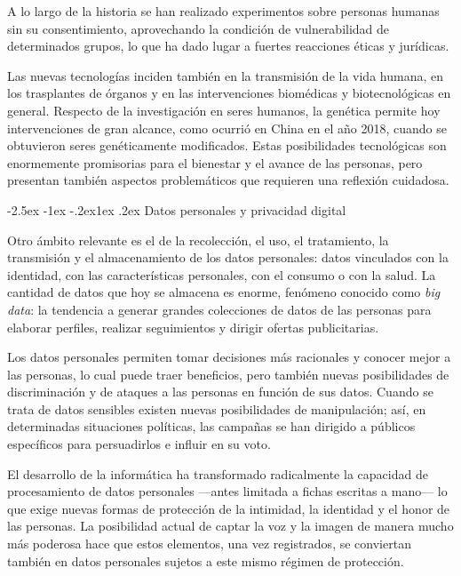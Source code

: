 \documentclass[12pt,oneside]{book}
\makeatletter
\renewcommand\subsection{\@startsection{subsection}{2}{\z@}%
  {-2.5ex \@plus -1ex \@minus -.2ex}{1ex \@plus .2ex}%
  {\normalfont\normalsize\bfseries}}
\makeatother
\begin{document}
\begin{nota}
A lo largo de la historia se han realizado experimentos sobre personas humanas sin su consentimiento, aprovechando la condición de vulnerabilidad de determinados grupos, lo que ha dado lugar a fuertes reacciones éticas y jurídicas.
\end{nota}

Las nuevas tecnologías inciden también en la transmisión de la vida humana, en los trasplantes de órganos y en las intervenciones biomédicas y biotecnológicas en general. Respecto de la investigación en seres humanos, la genética permite hoy intervenciones de gran alcance, como ocurrió en China en el año 2018, cuando se obtuvieron seres genéticamente modificados. Estas posibilidades tecnológicas son enormemente promisorias para el bienestar y el avance de las personas, pero presentan también aspectos problemáticos que requieren una reflexión cuidadosa.

\subsection{Datos personales y privacidad digital}

Otro ámbito relevante es el de la recolección, el uso, el tratamiento, la transmisión y el almacenamiento de los datos personales: datos vinculados con la identidad, con las características personales, con el consumo o con la salud. La cantidad de datos que hoy se almacena es enorme, fenómeno conocido como \textit{big data}: la tendencia a generar grandes colecciones de datos de las personas para elaborar perfiles, realizar seguimientos y dirigir ofertas publicitarias.

Los datos personales permiten tomar decisiones más racionales y conocer mejor a las personas, lo cual puede traer beneficios, pero también nuevas posibilidades de discriminación y de ataques a las personas en función de sus datos. Cuando se trata de datos sensibles existen nuevas posibilidades de manipulación; así, en determinadas situaciones políticas, las campañas se han dirigido a públicos específicos para persuadirlos e influir en su voto.

\begin{importante}
El desarrollo de la informática ha transformado radicalmente la capacidad de procesamiento de datos personales ---antes limitada a fichas escritas a mano--- lo que exige nuevas formas de protección de la intimidad, la identidad y el honor de las personas. La posibilidad actual de captar la voz y la imagen de manera mucho más poderosa hace que estos elementos, una vez registrados, se conviertan también en datos personales sujetos a este mismo régimen de protección.
\end{importante}
\end{document}
